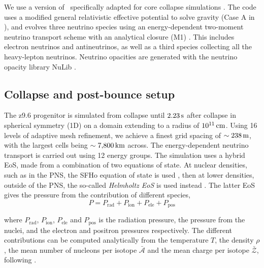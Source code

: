 We use a version of \flash\ specifically adapted for core collapse simulations \citep{Couch2013, Couch2014, OConnor2018a, OConnor2018b}. The code uses a modified general relativistic effective potential to solve gravity (Case A in \citealt{Marek2006}), and evolves three neutrino species using an energy-dependent two-moment neutrino transport scheme with an analytical closure (M1) \citep{OConnor2018a}. This includes electron neutrinos and antineutrinos, as well as a third species collecting all the heavy-lepton neutrinos. Neutrino opacities are generated with the neutrino opacity library NuLib \citep{OConnor2015, Sullivan2016}.

\subsection{Collapse and post-bounce setup} \label{sec:cc_setup}

The z9.6 progenitor is simulated from collapse until \(2.23\,\mathrm{s}\) after collapse in spherical symmetry (1D) on a domain extending to a radius of \(10^{11}\,\mathrm{cm}\). Using 16 levels of adaptive mesh refinement, we achieve a finest grid spacing of \(\sim238\,\mathrm{m}\), with the largest cells being \(\sim7{,}800\,\mathrm{km}\) across. The energy-dependent neutrino transport is carried out using 12 energy groups. The simulation uses a hybrid EoS, made from a combination of two equations of state. At nuclear densities, such as in the PNS, the SFHo equation of state is used \citep{Steiner2013}, then at lower densities, outside of the PNS, the so-called \emph{Helmholtz EoS} is used instead \citep{Timmes1999}. The latter EoS gives the pressure from the contribution of different species,
\begin{equation}
    P = P_\mathrm{rad} + P_\mathrm{ion} + P_\mathrm{ele} + P_\mathrm{pos}
\end{equation}

where \(P_\mathrm{rad}\), \(P_\mathrm{ion}\),  \(P_\mathrm{ele}\) and  \(P_\mathrm{pos}\) is the radiation pressure, the pressure from the nuclei, and the electron and positron pressures respectively. The different contributions can be computed analytically from the temperature \(T\), the density \(\rho\), the mean number of nucleons per isotope \(\bar{\mathcal{A}}\) and the mean charge per isotope \(\bar{\mathcal{Z}}\), following \cite{Timmes1999}.

